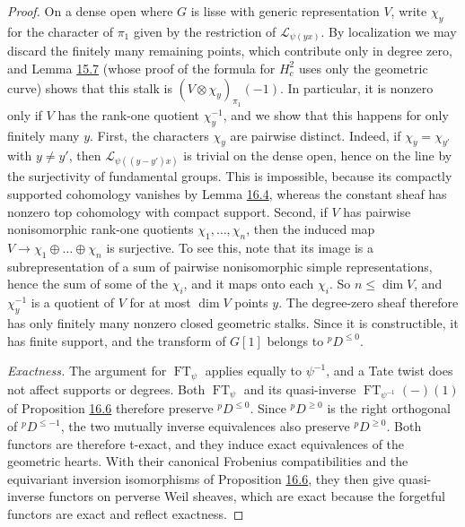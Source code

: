 \documentclass[11pt]{article}
\begin{document}
\begin{proof}[{Proof}]
On a dense open where \(G\) is lisse with generic representation \(V\), write \(\chi_y\) for the character of \(\pi_1\) given by the restriction of \(\mathcal L_{\psi(yx)}\). By localization we may discard the finitely many remaining points, which contribute only in degree zero, and Lemma \hyperref[bp140]{15.7} (whose proof of the formula for \(H^2_c\) uses only the geometric curve) shows that this stalk is \((V\otimes\chi_y)_{\pi_1}(-1)\). In particular, it is nonzero only if \(V\) has the rank-one quotient \(\chi_y^{-1}\), and we show that this happens for only finitely many \(y\). First, the characters \(\chi_y\) are pairwise distinct. Indeed, if \(\chi_y=\chi_{y'}\) with \(y\ne y'\), then \(\mathcal L_{\psi((y-y')x)}\) is trivial on the dense open, hence on the line by the surjectivity of fundamental groups. This is impossible, because its compactly supported cohomology vanishes by Lemma \hyperref[bp179]{16.4}, whereas the constant sheaf has nonzero top cohomology with compact support. Second, if \(V\) has pairwise nonisomorphic rank-one quotients \(\chi_1,\dots,\chi_n\), then the induced map \(V\to\chi_1\oplus\dots\oplus\chi_n\) is surjective. To see this, note that its image is a subrepresentation of a sum of pairwise nonisomorphic simple representations, hence the sum of some of the \(\chi_i\), and it maps onto each \(\chi_i\). So \(n\le\dim V\), and \(\chi_y^{-1}\) is a quotient of \(V\) for at most \(\dim V\) points \(y\). The degree-zero sheaf therefore has only finitely many nonzero closed geometric stalks. Since it is constructible, it has finite support, and the transform of \(G[1]\) belongs to \({}^pD^{\le0}\).

\emph{Exactness.} The argument for \(\operatorname{FT}_\psi\) applies equally to \(\psi^{-1}\), and a Tate twist does not affect supports or degrees. Both \(\operatorname{FT}_\psi\) and its quasi-inverse \(\operatorname{FT}_{\psi^{-1}}(-)(1)\) of Proposition \hyperref[bp185]{16.6} therefore preserve \({}^pD^{\le0}\). Since \({}^pD^{\ge0}\) is the right orthogonal of \({}^pD^{\le-1}\), the two mutually inverse equivalences also preserve \({}^pD^{\ge0}\). Both functors are therefore t-exact, and they induce exact equivalences of the geometric hearts. With their canonical Frobenius compatibilities and the equivariant inversion isomorphisms of Proposition \hyperref[bp185]{16.6}, they then give quasi-inverse functors on perverse Weil sheaves, which are exact because the forgetful functors are exact and reflect exactness.
\end{proof}
\end{document}
